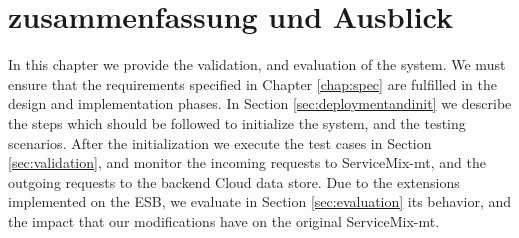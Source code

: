 \chapter{zusammenfassung und Ausblick}
\label{chap:zusammenfassung}


In this chapter we provide the validation, and evaluation of the system. We must ensure that the requirements specified in Chapter \ref{chap:spec} are fulfilled in the design and implementation phases. In Section \ref{sec:deploymentandinit} we describe the steps which should be followed to initialize the system, and the testing scenarios. After the initialization we execute the test cases in Section \ref{sec:validation}, and monitor the incoming requests to ServiceMix-mt, and the outgoing requests to the backend Cloud data store. Due to the extensions implemented on the \ac{ESB}, we evaluate in Section \ref{sec:evaluation} its behavior, and the impact that our modifications have on the original ServiceMix-mt.


